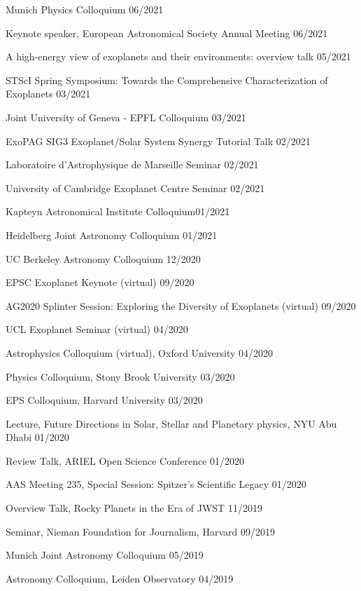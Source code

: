 \documentclass[12pt,letterpaper]{article}
\begin{document}
\begin{list}{}{\cvlist}
\item {Munich Physics Colloquium \hfill 06/2021}
\item {Keynote speaker, European Astronomical Society Annual Meeting \hfill 06/2021}
\item {A high-energy view of exoplanets and their environments: overview talk \hfill 05/2021}
\item {STScI Spring Symposium: Towards the Comprehensive Characterization of Exoplanets \hfill 03/2021}
\item {Joint University of Geneva - EPFL Colloquium \hfill 03/2021}
\item {ExoPAG SIG3 Exoplanet/Solar System Synergy Tutorial Talk \hfill 02/2021}
\item {Laboratoire d'Astrophysique de Marseille Seminar \hfill 02/2021}
\item {University of Cambridge Exoplanet Centre Seminar \hfill 02/2021}
\item {Kapteyn Astronomical Institute Colloquium\hfill 01/2021}
\item {Heidelberg Joint Astronomy Colloquium \hfill 01/2021}
\item {UC Berkeley Astronomy Colloquium \hfill 12/2020}
\item {EPSC Exoplanet Keynote (virtual) \hfill 09/2020}
\item {AG2020 Splinter Session: Exploring the Diversity of Exoplanets (virtual) \hfill 09/2020}
\item {UCL Exoplanet Seminar (virtual) \hfill 04/2020}
\item {Astrophysics Colloquium (virtual), Oxford University \hfill 04/2020}
\item {Physics Colloquium, Stony Brook University \hfill 03/2020}
\item {EPS Colloquium, Harvard University \hfill 03/2020}
\item {Lecture, Future Directions in Solar, Stellar and Planetary physics, NYU Abu Dhabi \hfill 01/2020}
\item {Review Talk, ARIEL Open Science Conference \hfill 01/2020} 
\item {AAS Meeting 235, Special Session: Spitzer's Scientific Legacy \hfill 01/2020}
\item {Overview Talk, Rocky Planets in the Era of JWST \hfill 11/2019}
\item {Seminar, Nieman Foundation for Journalism, Harvard \hfill 09/2019}
\item {Munich Joint Astronomy Colloquium \hfill 05/2019}
\item {Astronomy Colloquium, Leiden Observatory \hfill 04/2019}

\end{list}
\end{document}
